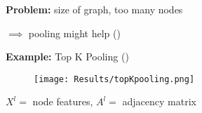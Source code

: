 \textbf{Problem:} size of graph, too many nodes\par
$\implies$ pooling might help (\cite{poolingInGNNs})\par
\textbf{Example:} Top K Pooling (\cite{topKPooling})
\begin{figure}
    \centering
    \texttt{[image: Results/topKpooling.png]}
\end{figure}
\begin{center}
    $X^l=$ node features, $A^l=$ adjacency matrix
\end{center}